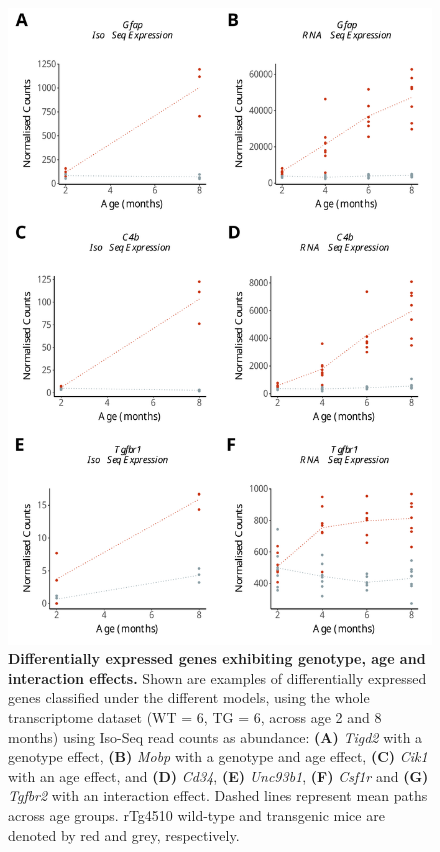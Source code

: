 \begin{figure}[h]
	\centering
	\includegraphics[page=5,scale = 0.55]{Figures/WholeDifferentialAnalysis.pdf}
	\captionsetup{width=0.95\textwidth}
	\caption[Examples of differential expression associated with genotype, age \& interaction effects]%
	{\textbf{Differentially expressed genes exhibiting genotype, age and interaction effects.} Shown are examples of differentially expressed genes classified under the different models, using the whole transcriptome dataset (WT = 6, TG = 6, across age 2 and 8 months) using Iso-Seq read counts as abundance: \textbf{(A)} \textit{Tigd2} with a genotype effect, \textbf{(B)} \textit{Mobp} with a genotype and age effect, \textbf{(C)} \textit{Cik1} with an age effect, and \textbf{(D)} \textit{Cd34}, \textbf{(E)} \textit{Unc93b1}, \textbf{(F)} \textit{Csf1r} and \textbf{(G)} \textit{Tgfbr2} with an interaction effect. Dashed lines represent mean paths across age groups. rTg4510 wild-type and transgenic mice are denoted by red and grey, respectively. }   
	\label{fig:dea_model_genexp}
\end{figure}
 
